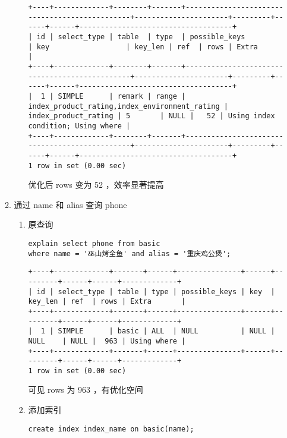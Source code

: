 \documentclass[11pt]{article}
\begin{document}
\begin{itemize}
\begin{enumerate}
\begin{enumerate}
\begin{verbatim}
+----+-------------+--------+-------+-----------------------------------------------+----------------------+---------+------+------+------------------------------------+
| id | select_type | table  | type  | possible_keys                                 | key                  | key_len | ref  | rows | Extra                              |
+----+-------------+--------+-------+-----------------------------------------------+----------------------+---------+------+------+------------------------------------+
|  1 | SIMPLE      | remark | range | index_product_rating,index_environment_rating | index_product_rating | 5       | NULL |   52 | Using index condition; Using where |
+----+-------------+--------+-------+-----------------------------------------------+----------------------+---------+------+------+------------------------------------+
1 row in set (0.00 sec)
\end{verbatim}

优化后 rows 变为 52 ，效率显著提高
\end{enumerate}

\item 通过 name 和 alias 查询 phone
\begin{enumerate}
\item 原查询

\begin{lstlisting}
explain select phone from basic
where name = '巫山烤全鱼' and alias = '重庆鸡公煲';
\end{lstlisting}

\begin{verbatim}
+----+-------------+-------+------+---------------+------+---------+------+------+-------------+
| id | select_type | table | type | possible_keys | key  | key_len | ref  | rows | Extra       |
+----+-------------+-------+------+---------------+------+---------+------+------+-------------+
|  1 | SIMPLE      | basic | ALL  | NULL          | NULL | NULL    | NULL |  963 | Using where |
+----+-------------+-------+------+---------------+------+---------+------+------+-------------+
1 row in set (0.00 sec)
\end{verbatim}

可见 rows 为 963 ，有优化空间

\item 添加索引

\begin{lstlisting}
create index index_name on basic(name);
\end{lstlisting}


\end{enumerate}
\end{enumerate}
\end{itemize}
\end{document}
